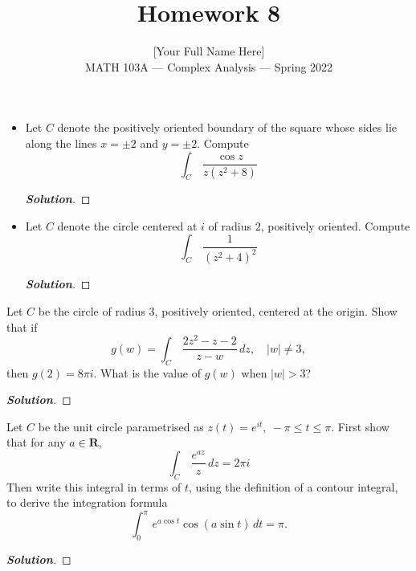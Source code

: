 \documentclass[11pt]{article}
\newenvironment{problem}[2][Problem\!]{\begin{trivlist}
\item[\hskip \labelsep {\bfseries #1}\hskip \labelsep {\bfseries #2.}]}{\end{trivlist}}
\newenvironment{solution}{\begin{proof}[\textbf{\textit{Solution}}]}{\end{proof}}
\newcommand{\rr}{\mathbf R}   %
\newcommand{\abs}[1]{\left\lvert#1\right\rvert} %
\renewcommand{\leq}{\leqslant}
\begin{document}
 
\title{Homework 8}
\author{[Your Full Name Here]\\[0.5em]
MATH 103A --- Complex Analysis --- Spring 2022}
\date{} 
\maketitle


\begin{problem}{8.1}\hfill
\begin{itemize}[itemsep=3em]
\item[(a)] Let $C$ denote the positively oriented boundary of the square whose sides lie along the lines $x = \pm 2$ and $y = \pm 2$. Compute
\[\int_C\,\frac{\cos z}{z(z^2 + 8)}\]
\begin{solution}
\end{solution}

\item[(b)] Let $C$ denote the circle centered at $i$ of radius $2$, positively oriented. Compute
\[\int_C\,\frac{1}{(z^2 + 4)^2}\]
\begin{solution}
\end{solution}

\end{itemize}
\end{problem}

\newpage  %

\begin{problem}{8.2}
Let $C$ be the circle of radius $3$, positively oriented, centered at the origin. Show that if
\[g(w) = \int_C\, \frac{2z^2 - z - 2}{z - w}\,dz,\quad \abs{w} \neq 3,\]
then $g(2) = 8\pi i$. What is the value of $g(w)$ when $|w| > 3$?
\end{problem}
\begin{solution}
\end{solution}

\newpage  %

\begin{problem}{8.3}
Let $C$ be the unit circle parametrised as $z(t) = e^{it},\  -\pi \leq t \leq \pi$. First show that for any $a \in \rr$,
\[\int_C\, \frac{e^{az}}{z}\,dz = 2\pi i\]
Then write this integral in terms of $t$, using the definition of a contour integral, to derive the integration formula
\[\int_0^\pi\, e^{a\cos t}\cos(a\sin t)\,dt = \pi.\]
\end{problem}
\begin{solution}
\end{solution}
\end{document}
